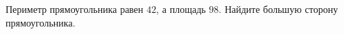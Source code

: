 \begin{ex}[type=none]
	\begin{condition}
		Периметр прямоугольника равен \( 42 \), а площадь \( 98 \). Найдите большую сторону прямоугольника.
	\end{condition}
	\answer{}
\end{ex}